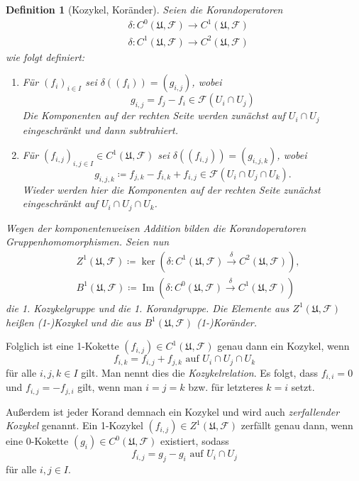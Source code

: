 \documentclass[11pt,a4paper,toc=bibliography]{scrartcl}
\theoremstyle{def}
\newtheorem{defi}{Definition}[section]
\theoremstyle{thm}
\theoremstyle{remark}
\DeclareMathOperator{\Ima}{Im}
\begin{document}
\begin{defi}[Kozykel, Koränder]
Seien die \emph{Korandoperatoren}
\begin{align*}
&\delta : C^0(\mathfrak{U},\mathcal{F})\rightarrow C^1(\mathfrak{U},\mathcal{F})\\
&\delta:C^1(\mathfrak{U}, \mathcal{F}) \rightarrow C^2(\mathfrak{U},\mathcal{F})
\end{align*}
wie folgt definiert:
\begin{enumerate}
\item
Für $(f_i)_{i\in I}$ sei $\delta ((f_i)) = (g_{i,j})$, wobei
\[
g_{i,j} = f_j-f_i \in \mathcal{F}(U_i\cap U_j)
\]
Die Komponenten auf der rechten Seite werden zunächst auf $U_i\cap U_j$ eingeschränkt und dann subtrahiert.
\item
Für $(f_{i,j})_{i,j\in I}\in C^1(\mathfrak{U}, \mathcal{F})$ sei $\delta ((f_{i,j})) = (g_{i,j,k})$, wobei
\[
g_{i,j,k}\coloneqq f_{j,k}-f_{i,k}+f_{i,j} \in \mathcal{F}(U_i\cap U_j \cap U_k).
\]
Wieder werden hier die Komponenten auf der rechten Seite zunächst eingeschränkt auf $U_i\cap U_j\cap U_k$.
\end{enumerate}
\vspace{0.5cm}
Wegen der komponentenweisen Addition bilden die Korandoperatoren Gruppenhomomorphismen. Seien nun
\begin{align*}
&Z^1(\mathfrak{U}, \mathcal{F}) \coloneqq \ker {(\delta:C^1(\mathfrak{U}, \mathcal{F}) \overset{\delta}{\rightarrow} C^2(\mathfrak{U},\mathcal{F}))}, \\
&B^1(\mathfrak{U}, \mathcal{F}) \coloneqq \Ima {(\delta:C^0(\mathfrak{U}, \mathcal{F}) \overset{\delta}{\rightarrow} C^1(\mathfrak{U},\mathcal{F}))}
\end{align*}
die \emph{1. Kozykelgruppe} und die \emph{1. Korandgruppe}. Die Elemente aus $Z^1(\mathfrak{U}, \mathcal{F})$ heißen \emph{(1-)Kozykel} und die aus $B^1(\mathfrak{U}, \mathcal{F})$ \emph{(1-)Koränder}.
\end{defi}
Folglich ist eine 1-Kokette $(f_{i,j})\in C^1(\mathfrak{U},\mathcal{F})$ genau dann ein Kozykel,
wenn
\[
f_{i,k} = f_{i,j}+f_{j,k} \text{ auf } U_i\cap U_j\cap U_k  
\]
für alle $i,j,k\in I$ gilt.
 Man nennt dies die \emph{Kozykelrelation}. Es folgt, dass $f_{i,i} = 0$ und $f_{i,j} = -f_{j,i}$ gilt, wenn man $i=j=k$ bzw. für letzteres $k=i$ setzt. 

Außerdem ist jeder Korand demnach ein Kozykel und wird auch \emph{zerfallender Kozykel} genannt.
Ein 1-Kozykel $(f_{i,j})\in Z^1(\mathfrak{U}, \mathcal{F})$ zerfällt genau dann, wenn eine 0-Kokette $ (g_i) \in C^0(\mathfrak{U}, \mathcal{F})$ existiert, sodass 
\[
f_{i,j} = g_j-g_i \text{ auf } U_i\cap U_j
\]
für alle $i,j\in I$.
\end{document}
